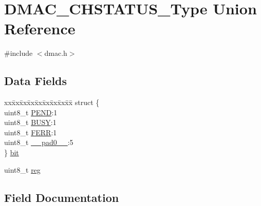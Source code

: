 \hypertarget{union_d_m_a_c___c_h_s_t_a_t_u_s___type}{}\section{D\+M\+A\+C\+\_\+\+C\+H\+S\+T\+A\+T\+U\+S\+\_\+\+Type Union Reference}
\label{union_d_m_a_c___c_h_s_t_a_t_u_s___type}


{\ttfamily \#include $<$dmac.\+h$>$}

\subsection*{Data Fields}
\begin{DoxyCompactItemize}
\item 
\begin{tabbing}
xx\=xx\=xx\=xx\=xx\=xx\=xx\=xx\=xx\=\kill
struct \{\\
\>uint8\_t \mbox{\hyperlink{union_d_m_a_c___c_h_s_t_a_t_u_s___type_a392d799a3e430846c2fecb0f84e2b870}{PEND}}:1\\
\>uint8\_t \mbox{\hyperlink{union_d_m_a_c___c_h_s_t_a_t_u_s___type_aaa250e13ec84e1063e9c18998da904e5}{BUSY}}:1\\
\>uint8\_t \mbox{\hyperlink{union_d_m_a_c___c_h_s_t_a_t_u_s___type_affc836cdcd2a27da4d3dc0a023b39cfa}{FERR}}:1\\
\>uint8\_t \mbox{\hyperlink{union_d_m_a_c___c_h_s_t_a_t_u_s___type_a8b4eebe79ded0459acec2f4950102ba3}{\_\_pad0\_\_}}:5\\
\} \mbox{\hyperlink{union_d_m_a_c___c_h_s_t_a_t_u_s___type_a893d8a6bbab755965be6551c854953f4}{bit}}\\

\end{tabbing}\item 
uint8\+\_\+t \mbox{\hyperlink{union_d_m_a_c___c_h_s_t_a_t_u_s___type_a9428adc9af4653a2050e2536b55dec8d}{reg}}
\end{DoxyCompactItemize}


\subsection{Field Documentation}
\mbox{\label{union_d_m_a_c___c_h_s_t_a_t_u_s___type_a8b4eebe79ded0459acec2f4950102ba3}} 
